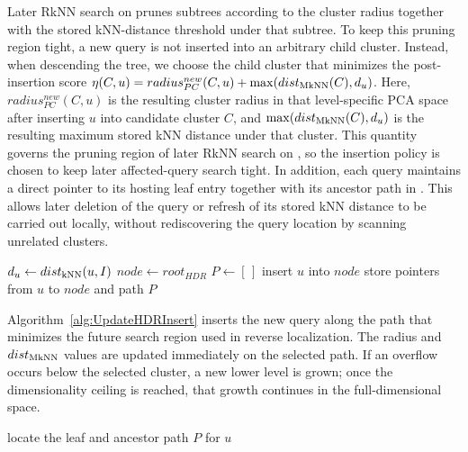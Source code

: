 Later RkNN search on \hdrtree prunes subtrees according to the cluster radius together with the stored kNN-distance threshold under that subtree. To keep this pruning region tight, a new query is not inserted into an arbitrary child cluster. Instead, when descending the tree, we choose the child cluster that minimizes the post-insertion score $\eta(C,u)=radius^{new}_{PC}(C,u)+\max(dist_{\operatorname{MkNN}}(C),d_u)$. Here, $radius^{new}_{PC}(C,u)$ is the resulting cluster radius in that level-specific PCA space after inserting $u$ into candidate cluster $C$, and $\max(dist_{\operatorname{MkNN}}(C),d_u)$ is the resulting maximum stored kNN distance under that cluster. This quantity governs the pruning region of later RkNN search on \hdrtree, so the insertion policy is chosen to keep later affected-query search tight. In addition, each query maintains a direct pointer to its hosting leaf entry together with its ancestor path in \hdrtree. This allows later deletion of the query or refresh of its stored kNN distance to be carried out locally, without rediscovering the query location by scanning unrelated clusters.

\begin{algorithm}[t]
\caption{Update\_HDR\_Insert($u$)}
\label{alg:UpdateHDRInsert}
$d_u \leftarrow dist_{\operatorname{kNN}}(u,I)$\;
$node \leftarrow root_{HDR}$\;
$P \leftarrow [\,]$\;
insert $u$ into $node$\;
store pointers from $u$ to $node$ and path $P$\;
\end{algorithm}

Algorithm~\ref{alg:UpdateHDRInsert} inserts the new query along the path that minimizes the future search region used in reverse localization. The radius and $dist_{\operatorname{MkNN}}$ values are updated immediately on the selected path. If an overflow occurs below the selected cluster, a new lower level is grown; once the dimensionality ceiling is reached, that growth continues in the full-dimensional space.

\begin{algorithm}[t]
\caption{HDR\_Adjust($u$, mode)}
\label{alg:UpdateHDRAdjust}
locate the leaf and ancestor path $P$ for $u$\;
\end{algorithm}

